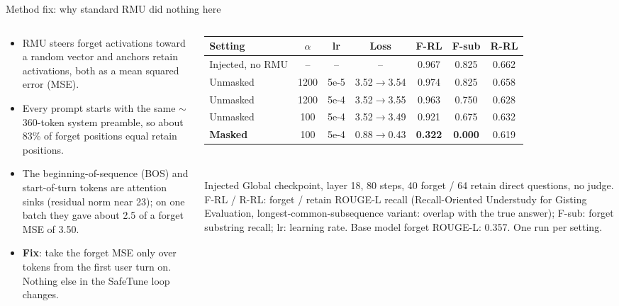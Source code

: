 \documentclass[aspectratio=169,11pt,usepdftitle=false]{beamer}
\begin{document}
\begin{frame}{Method fix: why standard RMU did nothing here}
\begin{columns}[T]
\begin{column}{0.45\textwidth}
\scriptsize
\begin{itemize}
\item RMU steers forget activations toward a random vector and anchors retain activations, both as a mean squared error (MSE).
\item Every prompt starts with the same $\sim$360-token system preamble, so about 83\% of forget positions equal retain positions.
\item The beginning-of-sequence (BOS) and start-of-turn tokens are attention sinks (residual norm near 23); on one batch they gave about 2.5 of a forget MSE of 3.50.
\item \textbf{Fix}: take the forget MSE only over tokens from the first user turn on. Nothing else in the SafeTune loop changes.
\end{itemize}
\end{column}
\begin{column}{0.53\textwidth}
\scriptsize
\setlength{\tabcolsep}{2.5pt}
\begin{tabular}{@{}lcccccc@{}}
\toprule
Setting & $\alpha$ & lr & Loss & F-RL & F-sub & R-RL\\
\midrule
Injected, no RMU & -- & -- & -- & 0.967 & 0.825 & 0.662\\
Unmasked & 1200 & 5e-5 & 3.52$\to$3.54 & 0.974 & 0.825 & 0.658\\
Unmasked & 1200 & 5e-4 & 3.52$\to$3.55 & 0.963 & 0.750 & 0.628\\
Unmasked & 100 & 5e-4 & 3.52$\to$3.49 & 0.921 & 0.675 & 0.632\\
\textbf{Masked} & 100 & 5e-4 & 0.88$\to$0.43 & \textbf{0.322} & \textbf{0.000} & 0.619\\
\bottomrule
\end{tabular}\\[3pt]
{\tiny Injected Global checkpoint, layer 18, 80 steps, 40 forget / 64 retain direct questions, no judge. F-RL / R-RL: forget / retain ROUGE-L recall (Recall-Oriented Understudy for Gisting Evaluation, longest-common-subsequence variant: overlap with the true answer); F-sub: forget substring recall; lr: learning rate. Base model forget ROUGE-L: 0.357. One run per setting.\par}
\end{column}

\end{columns}
\end{frame}
\end{document}
